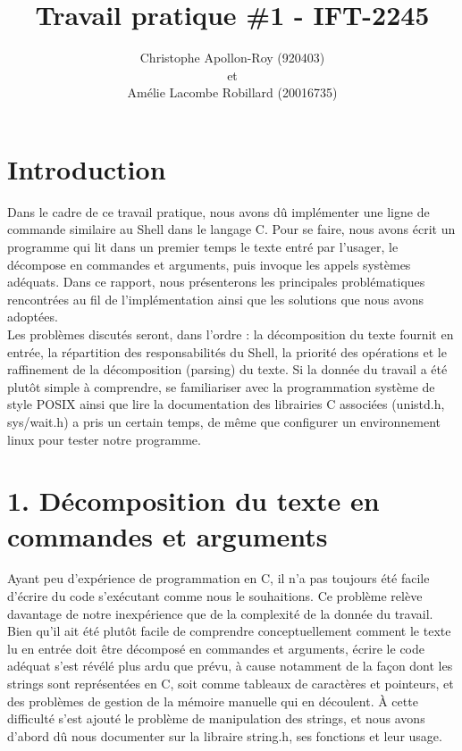\documentclass{article}
\title{Travail pratique \#1 - IFT-2245}
\author{Christophe Apollon-Roy (920403) \\et \\Amélie Lacombe Robillard (20016735)}
\begin{document}
\maketitle
\section*{ Introduction }
\setlength{\parindent}{20pt}
Dans le cadre de ce travail pratique, nous avons dû implémenter une ligne de commande similaire au Shell dans le langage C. Pour se faire, nous avons écrit un programme qui lit dans un premier temps le texte entré par l’usager, le décompose en commandes et arguments, puis invoque les appels systèmes adéquats. Dans ce rapport, nous présenterons les principales problématiques rencontrées au fil de l’implémentation ainsi que les solutions que nous avons adoptées. 
\\

\setlength{\parindent}{20pt}
Les problèmes discutés seront, dans l’ordre : la décomposition du texte fournit en entrée, la répartition des responsabilités du Shell, la priorité des opérations et le raffinement de la décomposition (parsing) du texte.  Si la donnée du travail a été plutôt simple à comprendre, se familiariser avec la programmation système de style POSIX ainsi que lire la documentation des librairies C associées (unistd.h, sys/wait.h) a pris un certain temps, de même que configurer un environnement linux pour tester notre programme. 
\\

\section*{ 1. Décomposition du texte en commandes et arguments }
\setlength{\parindent}{20pt}
Ayant peu d’expérience de programmation en C, il n’a pas toujours été facile d’écrire du code s’exécutant comme nous le souhaitions. Ce problème relève davantage de notre inexpérience que de la complexité de la donnée du travail. Bien qu’il ait été plutôt facile de comprendre conceptuellement comment le texte lu en entrée doit être décomposé en commandes et arguments, écrire le code adéquat s’est révélé plus ardu que prévu, à cause notamment de la façon dont les strings sont représentées en C, soit comme tableaux de caractères et pointeurs, et des problèmes de gestion de la mémoire manuelle qui en découlent.  À cette difficulté s’est ajouté le problème de manipulation des strings, et nous avons d’abord dû nous documenter sur la libraire string.h, ses fonctions et leur usage.
\\
\end{document}
